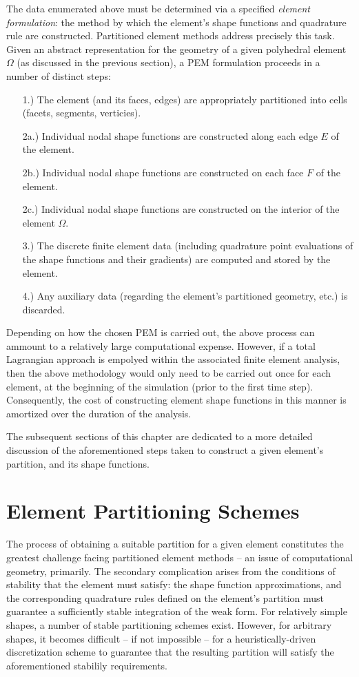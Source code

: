 	The data enumerated above must be determined via a specified \textit{element formulation}: the method by which the element's shape functions and quadrature rule are constructed. Partitioned element methods address precisely this task. Given an abstract representation for the geometry of a given polyhedral element $\Omega$ (as discussed in the previous section), a PEM formulation proceeds in a number of distinct steps:
	\begin{itemize}
		\item[1.)] The element (and its faces, edges) are appropriately partitioned into cells (facets, segments, verticies).
		\item[2a.)] Individual nodal shape functions are constructed along each edge $E$ of the element.
		\item[2b.)] Individual nodal shape functions are constructed on each face $F$ of the element.
		\item[2c.)] Individual nodal shape functions are constructed on the interior of the element $\Omega$.
		\item[3.)] The discrete finite element data (including quadrature point evaluations of the shape functions and their gradients) are computed and stored by the element.
		\item[4.)] Any auxiliary data (regarding the element's partitioned geometry, etc.) is discarded.
	\end{itemize}
	
	Depending on how the chosen PEM is carried out, the above process can ammount to a relatively large computational expense. However, if a total Lagrangian approach is empolyed within the associated finite element analysis, then the above methodology would only need to be carried out once for each element, at the beginning of the simulation (prior to the first time step). Consequently, the cost of constructing element shape functions in this manner is amortized over the duration of the analysis.
	
	The subsequent sections of this chapter are dedicated to a more detailed discussion of the aforementioned steps taken to construct a given element's partition, and its shape functions.
	
\section{Element Partitioning Schemes}

	The process of obtaining a suitable partition for a given element constitutes the greatest challenge facing partitioned element methods -- an issue of computational geometry, primarily. The secondary complication arises from the conditions of stability that the element must satisfy: the shape function approximations, and the corresponding quadrature rules defined on the element's partition must guarantee a sufficiently stable integration of the weak form. For relatively simple shapes, a number of stable partitioning schemes exist. However, for arbitrary shapes, it becomes difficult -- if not impossible -- for a heuristically-driven discretization scheme to guarantee that the resulting partition will satisfy the aforementioned stabilily requirements.

